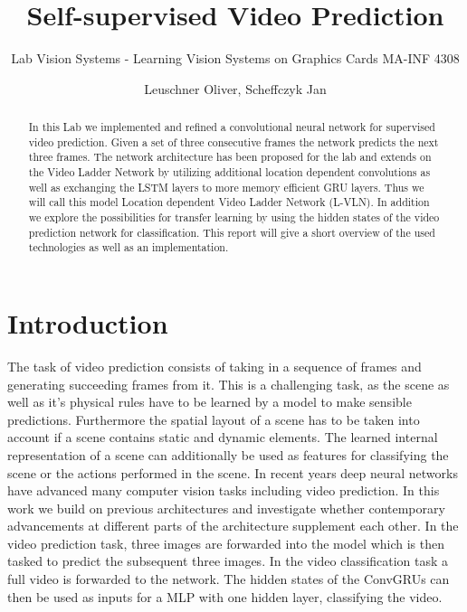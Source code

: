 \documentclass[runningheads,a4paper]{llncs}
\begin{document}
%
\frontmatter          %
%
\pagestyle{headings}  %
%
\mainmatter              %
%
\title{Self-supervised Video Prediction}
\subtitle{Lab Vision Systems - Learning Vision Systems on Graphics Cards  MA-INF 4308}
%
%
\author{Leuschner Oliver, Scheffczyk Jan}
%

\maketitle              %

\begin{abstract}
In this Lab we implemented and refined a convolutional neural network for supervised video prediction.  Given a set of three consecutive frames the network predicts the next three frames. The network architecture has been proposed for the lab and extends on the Video Ladder Network by utilizing additional location dependent convolutions as well as exchanging the LSTM layers to more memory efficient GRU layers. Thus we will call this model Location dependent Video Ladder Network (L-VLN). In addition we explore the possibilities for transfer learning by using the hidden states of the video prediction network for classification. This report will give a short overview of the used technologies as well as an  implementation.

\end{abstract}

\section{Introduction}
The task of video prediction consists of taking in a sequence of frames and generating succeeding frames from it. This is a challenging task, as the scene as well as it’s physical rules have to be learned by a model to make sensible predictions. Furthermore the spatial layout of a scene has to be taken into account if a scene contains static and dynamic elements. The learned internal representation of a scene can additionally be used as features for classifying the scene or the actions performed in the scene. In recent years deep neural networks have advanced many computer vision tasks including video prediction. In this work we build on previous architectures and investigate whether contemporary advancements at different parts of the architecture supplement each other.
In the video prediction task, three images are forwarded into the model which is then tasked to predict the subsequent three images. In the video classification task a full video is forwarded to the network. The hidden states of the ConvGRUs can then be used as inputs for a MLP with one hidden layer, classifying the video.
\end{document}
